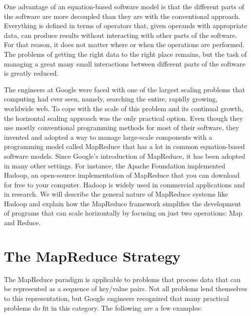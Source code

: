One advantage of an equation-based software model
is that the different parts of the software are more decoupled
than they are with the conventional approach.
Everything is defined in terms of operators
that, given operands with appropriate data,
can produce results without
interacting with other parts of the software.
For that reason, it does not matter where or when
the operations are performed.
The problems of getting the right data to the right place
remains, but the task of managing a great many small interactions
between different parts of the software is greatly reduced.

The engineers at Google were faced with one of the largest
scaling problems that computing had ever seen,
namely, searching the entire, rapidly growing, worldwide web.
To cope with the scale of this problem and its continual growth,
the horizontal scaling approach was the only practical option.
Even though they use mostly conventional programming methods
for most of their software,
they invented and adopted a way to manage large-scale components
with a programming model called MapReduce
that has a lot in common equation-based software models.
Since Google's introduction of MapReduce,
it has been adopted in many other settings.  For
instance, the Apache Foundation
implemented Hadoop, an
open-source implementation of MapReduce that you can
download for free to your computer.
Hadoop is widely used in commercial applications and in research.
We will describe the general nature of
MapReduce systems like Hadoop
and explain how the MapReduce framework simplifies the
development of programs that can scale horizontally by
focusing on just two operations: Map and Reduce.

\section{The MapReduce Strategy}

The \textsf{MapReduce} paradigm
is applicable to problems that process
data that can be represented as a sequence of
key/value pairs.
Not all problems lend themselves to this representation,
but Google engineers recognized that many practical
problems do fit in this category.
The following are a few examples:

